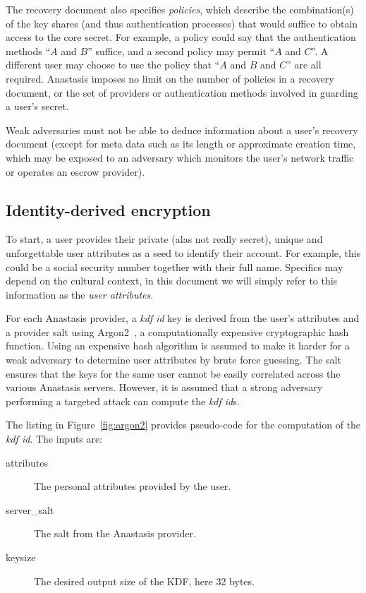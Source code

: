 The recovery document also specifies {\em policies}, which describe
the combination(s) of the key shares (and thus authentication
processes) that would suffice to obtain access to the core secret. For
example, a policy could say that the authentication methods ``$A$ and
$B$'' suffice, and a second policy may permit ``$A$ and $C$''. A
different user may choose to use the policy that ``$A$ and $B$ and
$C$'' are all required. Anastasis imposes no limit on the number of
policies in a recovery document, or the set of providers or
authentication methods involved in guarding a user’s secret.

Weak adversaries must not be able to deduce information about a user’s
recovery document (except for meta data such as its length or
approximate creation time, which may be exposed to an adversary which
monitors the user’s network traffic or operates an escrow provider).


\subsection{Identity-derived encryption}

To start, a user provides their private (alas not really secret),
unique and unforgettable user attributes as a seed to identify their
account. For example, this could be a social security number together
with their full name. Specifics may depend on the cultural context, in
this document we will simply refer to this information as the
{\em user attributes}.

For each Anastasis provider, a {\em kdf id} key is derived from the
user’s attributes and a provider salt using Argon2~\cite{BDK2016}, a
computationally expensive cryptographic hash function. Using an
expensive hash algorithm is assumed to make it harder for a weak
adversary to determine user attributes by brute force guessing.  The
salt ensures that the keys for the same user cannot be easily
correlated across the various Anastasis servers.  However, it is
assumed that a strong adversary performing a targeted attack can
compute the {\em kdf id}s.

The listing in Figure~\ref{fig:argon2} provides pseudo-code for
the computation of the {\em kdf id}. The inputs are:

\begin{description}
	\item[attributes] {The personal attributes provided by the user.}
	\item[server\_salt]{The salt from the Anastasis provider.}
	\item[keysize]{The desired output size of the KDF, here 32 bytes.}
\end{description}

